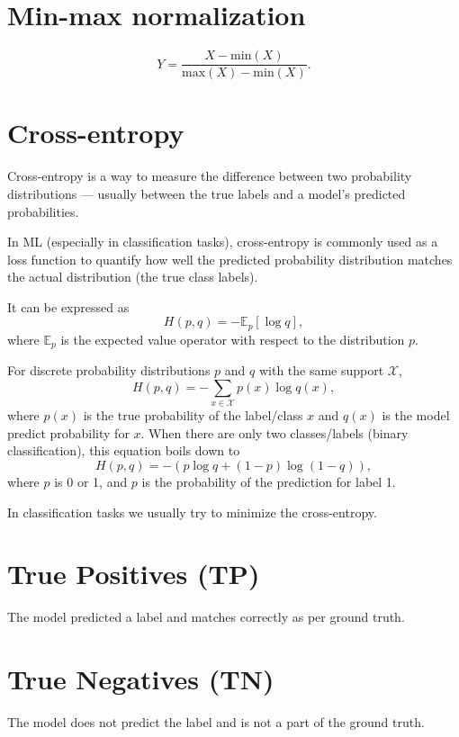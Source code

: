 \section{Min-max normalization}
\begin{equation}
  Y = \frac{X-\text{min}(X)}{\text{max}(X)-\text{min}(X)}.
\end{equation}

\section{Cross-entropy}
Cross-entropy is a way to measure the difference between two probability distributions — usually between the true labels and a model’s predicted probabilities.

In ML (especially in classification tasks), cross-entropy is commonly used as a loss function to quantify how well the predicted probability distribution matches the actual distribution (the true class labels).

It can be expressed as
\begin{equation}
  H(p,q) = -\mathbb{E}_p[\log q],
\end{equation}
where $\mathbb{E}_p$ is the expected value operator with respect to
the distribution $p$.

For discrete probability distributions $p$ and $q$ with the same support $\mathcal{X}$,
\begin{equation}
  H(p,q) = -\sum_{x\in\mathcal{X}}p(x)\log q(x),
\end{equation}
where $p(x)$ is the true probability of the label/class $x$ and $q(x)$ is the model predict probability for $x$. When there are only two classes/labels (binary classification), this equation boils down to
\begin{equation}
  H(p,q) = -(p\log q + (1-p)\log(1-q)),
\end{equation}
where $p$ is 0 or 1, and $p$ is the probability of the prediction for label 1.

In classification tasks we usually try to minimize the cross-entropy.

\section{True Positives (TP)}
The model predicted a label and matches correctly as per ground truth.

\section{True Negatives (TN)}
The model does not predict the label and is not a part of the ground truth.

